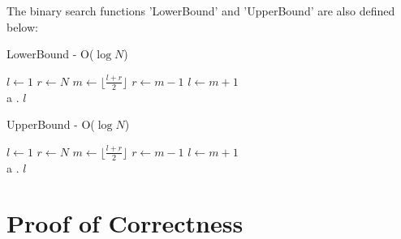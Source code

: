 \documentclass{article}
\begin{document}
The binary search functions 'LowerBound' and 'UpperBound' are also defined below:

\begin{algorithm}[H]
\begin{algorithmic}[1]

    \caption{LowerBound - O($\log N$)}

    \State $l \gets 1$ 
    \State $r \gets N$ 
        \State $m \gets \lfloor \frac{l+r}{2} \rfloor$
            \State $r \gets m-1$
        \Else
            \State $l \gets m+1$
        \EndIf
    \EndWhile \\
    \phantom a \phantom .
    \Return $l$
\EndFunction

\end{algorithmic}
\end{algorithm}

\begin{algorithm}[H]
\begin{algorithmic}[1]
    \caption{UpperBound - O($\log N$)}
    \State $l \gets 1$ 
    \State $r \gets N$ 
        \State $m \gets \lfloor \frac{l+r}{2} \rfloor$
            \State $r \gets m-1$
        \Else
            \State $l \gets m+1$
        \EndIf
    \EndWhile \\
    \phantom a \phantom .
    \Return $l$
\EndFunction

\end{algorithmic}
\end{algorithm}

\section{Proof of Correctness}
\end{document}

